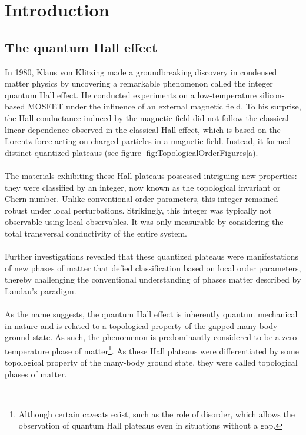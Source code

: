 \chapter{Introduction}\label{ch:introduction}
\section{The quantum Hall effect}
In 1980, Klaus von Klitzing made a groundbreaking discovery in condensed matter physics by uncovering a remarkable phenomenon called the integer quantum Hall effect. He conducted experiments on a low-temperature silicon-based MOSFET under the influence of an external magnetic field. To his surprise, the Hall conductance induced by the magnetic field did not follow the classical linear dependence observed in the classical Hall effect, which is based on the Lorentz force acting on charged particles in a magnetic field. Instead, it formed distinct quantized plateaus (see figure \ref{fig:TopologicalOrderFigures}a).
\\\\
The materials exhibiting these Hall plateaus possessed intriguing new properties: they were classified by an integer, now known as the topological invariant or Chern number. Unlike conventional order parameters, this integer remained robust under local perturbations. Strikingly, this integer was typically not observable using local observables. It was only measurable by considering the total transversal conductivity of the entire system.
\\\\
Further investigations revealed that these quantized plateaus were manifestations of new phases of matter that defied classification based on local order parameters, thereby challenging the conventional understanding of phases matter described by Landau's paradigm.
\\\\
As the name suggests, the quantum Hall effect is inherently quantum mechanical in nature and is related to a topological property of the gapped many-body ground state. As such, the phenomenon is predominantly considered to be a zero-temperature phase of matter\footnote{Although certain caveats exist, such as the role of disorder, which allows the observation of quantum Hall plateaus even in situations without a gap.}. As these Hall plateaus were differentiated by some topological property of the many-body ground state, they were called topological phases of matter.
\\\\
